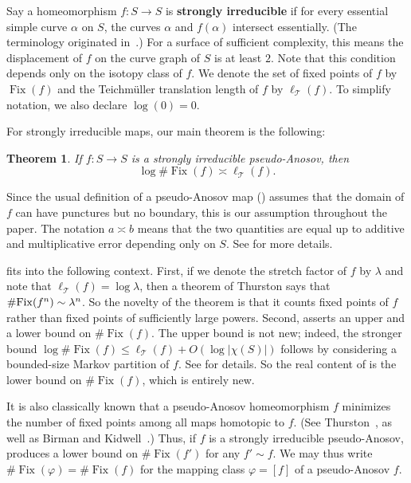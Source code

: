 \documentclass[11pt,letterpaper]{amsart}
\newcommand{\teich}{\mathcal T}
\newcommand{\Fix}{\operatorname{Fix}}
\numberwithin{equation}{section}
\newtheorem{theorem}{Theorem}[section]
\theoremstyle{definition}
\newcommand{\T}{\mathcal{T}}
\newcommand{\define}[1]{\textbf{#1}}
\begin{document}
Say a homeomorphism $f \colon S \to S$ is \define{strongly irreducible} if for every essential simple curve $\alpha$ on $S$, the curves $\alpha$ and $f(\alpha)$ intersect essentially. (The terminology originated in~\cite{Schleimer:StronglyIrreducible}.) For a surface of sufficient complexity, this means the displacement of $f$ on the curve graph of $S$ is at least $2$. Note that this condition depends only on the isotopy class of $f$. 
We denote the set of fixed points of $f$ by $\Fix(f)$ and the Teichm\"uller translation length of $f$ by $\ell_{\T}(f)$. To simplify notation, we also declare $\log(0) = 0$.

For strongly irreducible maps, our main theorem is the following:

\begin{theorem} \label{th:intro_main}
If $f \colon S \to S$ is a strongly irreducible pseudo-Anosov, then
\[
 \log \# \Fix(f) \asymp  \ell_{\T}(f).
\]
\end{theorem}

Since the usual definition of a pseudo-Anosov map () assumes that the domain of $f$ can have punctures but no boundary, this is our assumption throughout the paper.
The notation $a \asymp b$ means that the two quantities are equal up to additive and multiplicative error depending only on $S$. See  for more details.

 fits into the following context. 
First, if we denote the stretch factor of $f$ by $\lambda$ 
and note that $\ell_{\T}(f) = \log \lambda$, then a theorem 
of Thurston \cite{Thurston:GeometryDynamics} says that 
$\# {\rm Fix}(f^n) \sim \lambda^n$. So the novelty of the 
theorem is that it counts fixed points of $f$ rather than 
fixed points of sufficiently large powers. Second,  
 asserts an upper and a lower bound on 
$\# \Fix(f)$. The upper bound is not new; indeed, the stronger 
bound $\log \# \Fix(f) \leq \ell_\teich(f) + O(\log |\chi(S)|)$ 
follows by considering a bounded-size Markov partition of $f$. 
See  for  details. So the real content of  is the lower bound on $\# \Fix(f)$, which is entirely new. 

It is also classically known that a pseudo-Anosov homeomorphism $f$ minimizes the number of fixed points among all maps homotopic to $f$. 
(See Thurston~\cite{Thurston:GeometryDynamics}, as well as Birman and Kidwell~\cite{BirmanKidwell}.) Thus, if $f$ is a strongly irreducible pseudo-Anosov,  
produces a lower bound on $\#\Fix(f')$ for any $f'  \sim f$. We may thus write
$\#\Fix(\varphi) = \#\Fix(f)$ for the mapping class $\varphi = [f]$ of a pseudo-Anosov $f$.
\end{document}
